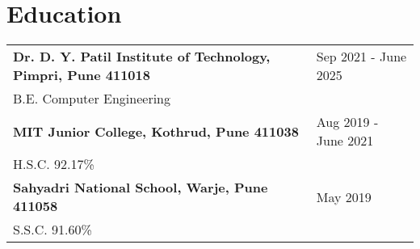 \documentclass[a4paper,10pt]{article}
\makeatletter
\newenvironment{jobshort}[2]
    {
    \begin{tabularx}{\linewidth}{@{}l X r@{}}
    \textbf{#1} & \hfill &  #2 \\[3.75pt]
    \end{tabularx}
    }
    {
    }
\newenvironment{joblong}[2]
    {
    \begin{tabularx}{\linewidth}{@{}l X r@{}}
    \textbf{#1} & \hfill &  #2 \\[3.75pt]
    \end{tabularx}
    \begin{minipage}[t]{\linewidth}
    \begin{itemize}[nosep,after=\strut, leftmargin=1em, itemsep=3pt,label=--]
    }
    {
    \end{itemize}
    \end{minipage}    
    }
\makeatother
\begin{document}
\section{Education}
\begin{tabularx}{\linewidth}{@{}l X@{}}	

\textbf{Dr. D. Y. Patil Institute of Technology, Pimpri, Pune 411018} & \hfill 
Sep 2021 - June 2025 \\ \vspace*{2mm}
B.E. Computer Engineering \\ 

\textbf{MIT Junior College, Kothrud, Pune 411038} & \hfill 
Aug 2019 - June 2021 \\ \vspace*{2mm}
H.S.C. 92.17\% \\ 

\textbf{Sahyadri National School, Warje, Pune 411058} & \hfill 
May 2019 \\ 
S.S.C. 91.60\% \\

\end{tabularx}




  
\end{document}
